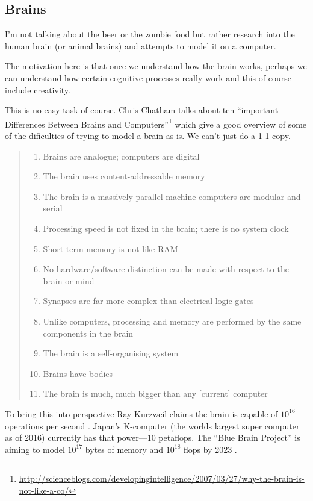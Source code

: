 {\subsection{Brains}

I'm not talking about the beer or the zombie food but rather research into the human brain (or animal brains) and attempts to model it on a computer. 

The motivation here is that once we understand how the brain works, perhaps we can understand how certain cognitive processes really work and this of course include creativity.

This is no easy task of course. Chris Chatham talks about ten ``important Differences Between Brains and Computers''\footnote{\url{http://scienceblogs.com/developingintelligence/2007/03/27/why-the-brain-is-not-like-a-co/}} which give a good overview of some of the dificulties of trying to model a brain as is. We can't just do a 1-1 copy.

\begin{quotation}
  \begin{enumerate}
    \item Brains are analogue; computers are digital
    \item The brain uses content-addressable memory
    \item The brain is a massively parallel machine computers are modular and serial
    \item Processing speed is not fixed in the brain; there is no system clock
    \item Short-term memory is not like RAM
    \item No hardware/software distinction can be made with respect to the brain or mind
    \item Synapses are far more complex than electrical logic gates
    \item Unlike computers, processing and memory are performed by the same components in the brain
    \item The brain is a self-organising system
    \item Brains have bodies
    \item	The brain is much, much bigger than any [current] computer
  \end{enumerate}
\end{quotation}

To bring this into perspective Ray Kurzweil claims the brain is capable of $10^{16}$ operations per second \citeyear[p.194]{Kurzweil2013}. Japan's K-computer (the worlds largest super computer as of 2016) currently has that power---10 petaflops. The ``Blue Brain Project'' is aiming to model $10^17$ bytes of memory and $10^{18}$ flops by 2023 \autocite[p.125]{Kurzweil2013}.

}
